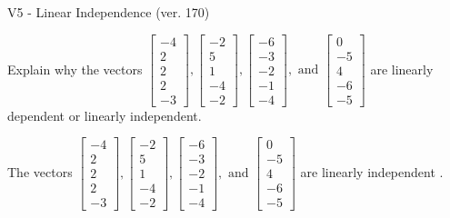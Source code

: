 \begin{exercise}
  \begin{exerciseTitle}V5 - Linear Independence (ver. 170)\end{exerciseTitle}
  \begin{exerciseStatement}
    Explain why the vectors \(\left[\begin{array}{r}
-4 \\
2 \\
2 \\
2 \\
-3
\end{array}\right] , \left[\begin{array}{r}
-2 \\
5 \\
1 \\
-4 \\
-2
\end{array}\right] , \left[\begin{array}{r}
-6 \\
-3 \\
-2 \\
-1 \\
-4
\end{array}\right] , \text{ and } \left[\begin{array}{r}
0 \\
-5 \\
4 \\
-6 \\
-5
\end{array}\right]\) are linearly dependent or linearly independent.	


  \end{exerciseStatement}
  \begin{exerciseAnswer}
   The vectors \(\left[\begin{array}{r}
-4 \\
2 \\
2 \\
2 \\
-3
\end{array}\right] , \left[\begin{array}{r}
-2 \\
5 \\
1 \\
-4 \\
-2
\end{array}\right] , \left[\begin{array}{r}
-6 \\
-3 \\
-2 \\
-1 \\
-4
\end{array}\right] , \text{ and } \left[\begin{array}{r}
0 \\
-5 \\
4 \\
-6 \\
-5
\end{array}\right]\) are 
  	 linearly independent  .
  


  \end{exerciseAnswer}
\end{exercise}